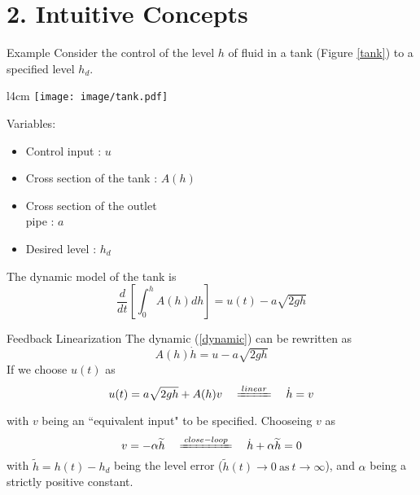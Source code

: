 \documentclass{beamer}
\begin{document}
  \section{2. Intuitive Concepts}

  \begin{frame}{Example}
    Consider the control of the level $h$ of fluid in a tank (Figure \ref{tank}) to a specified level $h_{d}$.

    \begin{wrapfigure}{l}{4cm}
    \vspace{-10pt}
    \texttt{[image: image/tank.pdf]}\\
    \vspace{-15pt}
    \caption{Fluid level control in a tank}\label{tank}
    \vspace{-10pt}
    \end{wrapfigure}

    Variables:
    \begin{itemize}
      \item Control input : $u$
      \item Cross section of the tank : $A(h)$
      \item Cross section of the outlet \\ pipe : $a$
      \item Desired level : $h_{d}$
    \end{itemize}

    The dynamic model of the tank is
    \begin{equation}\label{dynamic}
      \frac{d}{dt}\left[\int_{0}^{h}A(h)dh\right] = u(t) - a \sqrt{2gh}
    \end{equation}

  \end{frame}


  \begin{frame}{Feedback Linearization}
  The dynamic (\ref{dynamic}) can be rewritten as
  $$ A(h)\dot{h} = u-a\sqrt{2gh} $$
  If we choose $u(t)$ as
  $$ u(t) = a\sqrt{2gh} + A(h)v \quad \xlongequal{linear} \quad \dot{h}=v $$

  with $v$ being an ``equivalent input" to be specified. 
  Chooseing $v$ as
  $$ v=-\alpha \widetilde{h} \quad \xlongequal{close-loop} \quad \dot{h}+\alpha \widetilde{h}=0 $$
  with $\widetilde{h} = h(t)-h_{d}$ being the level error ($\widetilde{h}(t)\rightarrow 0 ~\text{as}~ t \rightarrow \infty$), and $\alpha$ being a strictly positive constant.
  \end{frame}
  
\end{document}

